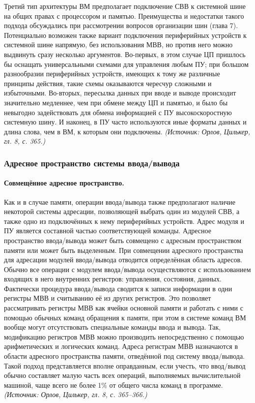 \documentclass[a4paper,12pt]{article}
\begin{document}
Третий тип архитектуры ВМ предполагает подключение СВВ к системной шине на общих правах с процессором и памятью. Преимущества и недостатки такого подхода обсуждались при рассмотрении вопросов организации шин (глава 7). Потенциально возможен также вариант подключения периферийных устройств к системной шине напрямую, без использования МВВ, но против него можно выдвинуть сразу несколько аргументов. Во-первых, в этом случае ЦП пришлось бы оснащать универсальными схемами для управления любым ПУ; при большом разнообразии периферийных устройств, имеющих к тому же различные принципы действия, такие схемы оказываются чересчур сложными и избыточными. Во-вторых, пересылка данных при вводе и выводе происходит значительно медленнее, чем при обмене между ЦП и памятью, и было бы невыгодно задействовать для обмена информацией с ПУ высокоскоростную системную шину. И наконец, в ПУ часто используются иные форматы данных и длина слова, чем в ВМ, к которым они подключены.
\textit{(Источник: Орлов, Цилькер, гл. 8, с. 365.)}

\subsubsection{Адресное пространство системы ввода/вывода}

\paragraph{Совмещённое адресное пространство.}
Как и в случае памяти, операции ввода/вывода также предполагают наличие некоторой системы адресации, позволяющей выбрать один из модулей СВВ, а также одно из подключённых к нему периферийных устройств. Адрес модуля и ПУ является составной частью соответствующей команды. Адресное пространство ввода/вывода может быть совмещено с адресным пространством памяти или может быть выделенным. При совмещении адресного пространства для адресации модулей ввода/вывода отводится определённая область адресов. Обычно все операции с модулем ввода/вывода осуществляются с использованием входящих в него внутренних регистров: управления, состояния, данных. Фактически процедура ввода/вывода сводится к записи информации в одни регистры МВВ и считыванию её из других регистров. Это позволяет рассматривать регистры МВВ как ячейки основной памяти и работать с ними с помощью обычных команд обращения к памяти, при этом в системе команд ВМ вообще могут отсутствовать специальные команды ввода и вывода. Так, модификацию регистров МВВ можно производить непосредственно с помощью арифметических и логических команд. Адреса регистрам МВВ назначаются в области адресного пространства памяти, отведённой под систему ввода/вывода. Такой подход представляется вполне оправданным, если учесть, что ввод/вывод обычно составляет малую часть всех операций, выполняемых вычислительной машиной, чаще всего не более 1\% от общего числа команд в программе.
\textit{(Источник: Орлов, Цилькер, гл. 8, с. 365--366.)}
\end{document}
